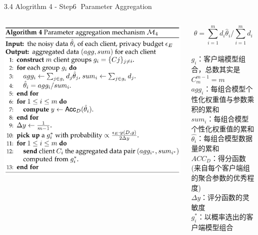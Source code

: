 \documentclass{sintefbeamer}
\theoremstyle{definition}
\begin{document}
\begin{frame}{3.4 Alogrithm 4 - Step\textcircled{6} Parameter Aggregation}{\empty}
\begin{columns}
\begin{column}{0.6\textwidth}
\vspace{0.5em}
\includegraphics[width=1\textwidth]{images/algo4}
\end{column}
\begin{column}{0.4\textwidth}

$$
\theta=\sum_{i=1}^m d_i \hat{\theta}_i / \sum_{i=1}^m d_i
$$
\\
$g_i$：客户端模型组合，总数其实是 $C_{m}^{m-1}=m$\\
$agg_i$：每组合模型个性化权重值与参数乘积的累和\\
$sum_i$：每组合模型个性化权重值的累和\\
$\hat{\theta_i}$：每组合模型数据量的累和\\
$ACC_D$：得分函数(来自每个客户端组的聚合参数的优秀程度)\\
$\Delta y$：评分函数的灵敏度\\
$g^*_i$：以概率选出的客户端模型组合
\end{column}
\end{columns}
\end{frame}
\end{document}
